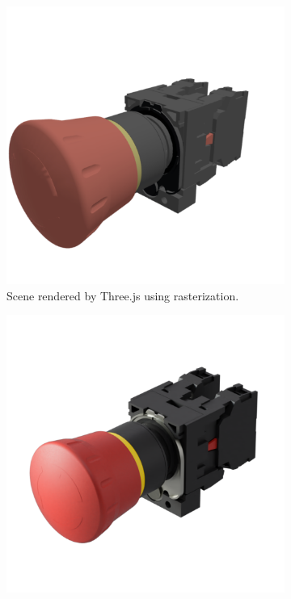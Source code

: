 \begin{figure}[H]
  \centering
  \begin{subfigure}[t]{0.3\textwidth}
    \includegraphics[width=\textwidth]{resources/comparison-three-js.png}
    \caption{Scene rendered by \gls{Three.js} using rasterization.}
    \label{fig:rasterization-rendering}
  \end{subfigure}
  \hfill
  \begin{subfigure}[t]{0.3\textwidth}
    \includegraphics[width=\textwidth]{resources/comparison-offline-rendering.png}

\end{subfigure}
\end{figure}
